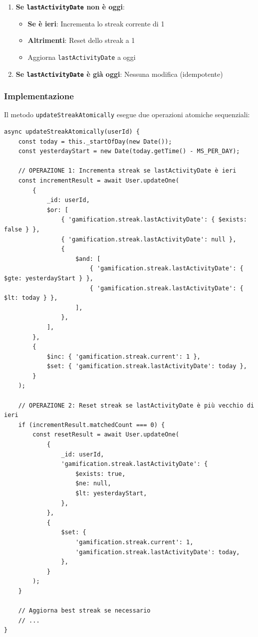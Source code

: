 \documentclass[11pt,a4paper]{article}
\begin{document}
\begin{enumerate}
    \item \textbf{Se \texttt{lastActivityDate} non è oggi}:
    \begin{itemize}
        \item \textbf{Se è ieri}: Incrementa lo streak corrente di 1
        \item \textbf{Altrimenti}: Reset dello streak a 1
        \item Aggiorna \texttt{lastActivityDate} a oggi
    \end{itemize}
    \item \textbf{Se \texttt{lastActivityDate} è già oggi}: Nessuna modifica (idempotente)
\end{enumerate}

\subsubsection{Implementazione}

Il metodo \texttt{updateStreakAtomically} esegue due operazioni atomiche sequenziali:

\begin{lstlisting}
async updateStreakAtomically(userId) {
    const today = this._startOfDay(new Date());
    const yesterdayStart = new Date(today.getTime() - MS_PER_DAY);
    
    // OPERAZIONE 1: Incrementa streak se lastActivityDate è ieri
    const incrementResult = await User.updateOne(
        {
            _id: userId,
            $or: [
                { 'gamification.streak.lastActivityDate': { $exists: false } },
                { 'gamification.streak.lastActivityDate': null },
                {
                    $and: [
                        { 'gamification.streak.lastActivityDate': { $gte: yesterdayStart } },
                        { 'gamification.streak.lastActivityDate': { $lt: today } },
                    ],
                },
            ],
        },
        {
            $inc: { 'gamification.streak.current': 1 },
            $set: { 'gamification.streak.lastActivityDate': today },
        }
    );

    // OPERAZIONE 2: Reset streak se lastActivityDate è più vecchio di ieri
    if (incrementResult.matchedCount === 0) {
        const resetResult = await User.updateOne(
            {
                _id: userId,
                'gamification.streak.lastActivityDate': {
                    $exists: true,
                    $ne: null,
                    $lt: yesterdayStart,
                },
            },
            {
                $set: {
                    'gamification.streak.current': 1,
                    'gamification.streak.lastActivityDate': today,
                },
            }
        );
    }
    
    // Aggiorna best streak se necessario
    // ...
}
\end{lstlisting}
\end{document}
